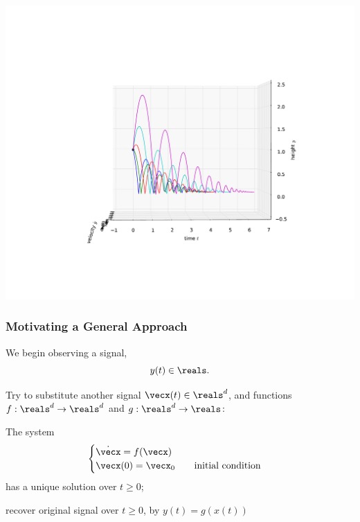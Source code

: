 \documentclass[12pt]{beamer}
\begin{document}
\begin{frame}
\vfill\centering
\includegraphics[width=.9\linewidth]{bouncing_ball_reflattened}
\vfill\null
\end{frame}




\begin{frame}
\frametitle{Motivating a General Approach}

\begin{itemize}

\vitem We begin observing a signal,
\[
y(t) \in \reals.
\]



\vitem Try to substitute another signal $\vecx(t) \in \reals^d$, and
functions $f : \reals^d \to \reals^d$ and $g : \reals^d \to \reals$:

\begin{enumerate}
\vitem The system
\[
\begin{cases}
	\dot \vecx = f(\vecx) \\
	\vecx(0) = \vecx_0 \qquad \text{initial condition}
\end{cases}
\]
has a unique solution over $t \geq 0$;

\vitem recover original signal over $t \geq 0$, by $y(t) = g( x(t) )$ 


\end{enumerate}

\end{itemize}

\vfill\null
\end{frame}
\end{document}
